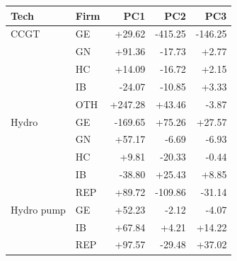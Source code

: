 \begin{tabular}{l l r r r}
\toprule
Tech & Firm & PC1 & PC2 & PC3 \\
\midrule
CCGT & GE & +29.62 & -415.25 & -146.25 \\
 & GN & +91.36 & -17.73 & +2.77 \\
 & HC & +14.09 & -16.72 & +2.15 \\
 & IB & -24.07 & -10.85 & +3.33 \\
 & OTH & +247.28 & +43.46 & -3.87 \\
\addlinespace
Hydro & GE & -169.65 & +75.26 & +27.57 \\
 & GN & +57.17 & -6.69 & -6.93 \\
 & HC & +9.81 & -20.33 & -0.44 \\
 & IB & -38.80 & +25.43 & +8.85 \\
 & REP & +89.72 & -109.86 & -31.14 \\
\addlinespace
Hydro pump & GE & +52.23 & -2.12 & -4.07 \\
 & IB & +67.84 & +4.21 & +14.22 \\
 & REP & +97.57 & -29.48 & +37.02 \\
\bottomrule
\end{tabular}